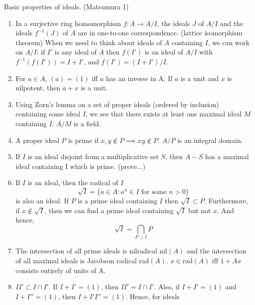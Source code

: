 \begin{notes}
      Basic properties of ideals. (Matsumura 1)
\end{notes}

\begin{enumerate}
      \item
            In a surjective ring homomorphism $f:A \to A/I$, the ideals $J$
            of $A/I$ and the ideals $f^{-1}(J)$ of $A$ are in one-to-one
            correspondence. (lattice isomorphism theorem) When we need to think about ideals of $A$
            containing $I$, we can work on $A/I$: if $I'$ is any ideal of
            $A$ then $f(I')$ is an ideal of $A/I$ with $f^{-1}(f(I'))=I+I'$,
            and $f(I') = (I+I')/I$.
      \item
            For $a \in A$, $(a)=(1)$ iff $a$ has an inverse in A.
            If $a$ is a unit and $x$ is nilpotent, then $a+x$ is a unit.
      \item
            Using Zorn's lemma on a set of proper ideals (ordered by inclusion)
            containing some ideal $I$, we see that
            there exists at least one maximal ideal $M$ containing $I$.
            $A/M$ is a field.
      \item
            A proper ideal $P$ is prime if $x,y \notin P \implies xy \notin
                  P$. $A/P$ is an integral domain.
      \item
            If $I$ is an ideal disjoint from a multiplicative set $S$, then $A-S$
            has a maximal ideal containing I which is prime. (prove...)
      \item
            If $I$ is an ideal, then the radical of $I$
            $$ \sqrt{I}=\{a\in A : a^n \in I \text{ for some } n>0\}$$
            is also an ideal. If $P$ is a prime ideal containing $I$ then $\sqrt{I}
                  \subset P$. Furthermore, if $x \notin \sqrt{I}$, then we can find
            a prime ideal containing $\sqrt{I}$ but not $x$. And hence,
            $$\sqrt{I}=\bigcap_{P \supset I}{P}$$
      \item
            The intersection of all prime ideals is nilradical nil$(A)$ and the
            intersection of all maximal ideals is Jacobson radical rad$(A)$.
            $x\in \text{rad}(A) \text{ iff } 1+Ax$ consists entirely of units of A.
      \item\label{idealsinduction}
            $II' \subset I\cap I'$. If $I+I'=(1)$, then $II' = I\cap I'$. Also,
            if $I+I'=(1)$ and $I+I''=(1)$, then $I+I'I'' = (1)$. Hence, for ideals

\end{enumerate}
